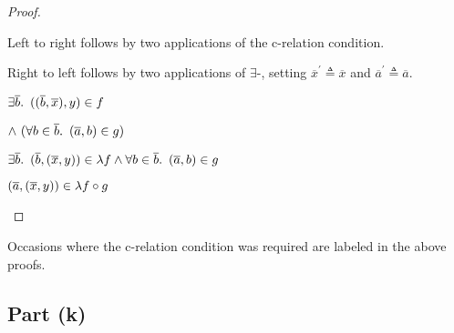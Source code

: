 \begin{prop}
\begin{proof}
\begin{itemize}
    \step
      Left to right follows by two applications of the c-relation condition.

    \step
      Right to left follows by two applications of $\exists$-\Intro, setting $\overline{x}^\prime\triangleq\overline{x}$ and $\overline{a}^\prime\triangleq\overline{a}$.

    \step[\iffs]
      $\exists\overline{b}\ldotp~((\overline{b},\overline{x}),y)\in f$

    \addtolength{\itemsep}{-.3\baselineskip}
    \step
      \quad$\land~(\forall b\in\overline{b}\ldotp~(\overline{a},b)\in g)$
    \addtolength{\itemsep}{.3\baselineskip}

    \step[\iffs]
      $\exists\overline{b}\ldotp~(\overline{b},(\overline{x},y))\in \lambda f\land\forall b\in\overline{b}\ldotp~(\overline{a},b)\in g$
     \marginnote{\Def-$\lambda\cdot$}

    \step[\iffs]
      $(\overline{a},(\overline{x},y))\in\lambda f\circ g$
      \qedhere
    \end{itemize}
  \end{proof}
\end{prop}

Occasions where the c-relation condition was required are labeled in the above proofs.

\subsection{Part (k)}\label{sec:q-2-k}

